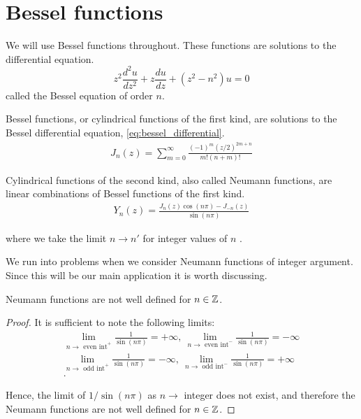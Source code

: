 \section{Bessel functions}
We will use Bessel functions throughout. These functions are solutions to the differential equation.
  \begin{equation}\label{eq:bessel_differential}
      z^2 \frac{d^2 u}{dz^2} + z\frac{du}{dz} + (z^2 - n^2)u = 0
  \end{equation}
called the Bessel equation of order $n$.\par
  \begin{defn}\label{defn:bessel_func}
  \parencite{korenev02bessel_func} Bessel functions, or cylindrical functions of the first kind, are solutions to the Bessel differential equation, \eqref{eq:bessel_differential}.
    \begin{align*}
        J_n(z) = \sum^\infty_{m=0} \frac{
        (-1)^m (z/2)^{2m+n} }{
        m! (n+m)! }
    \end{align*}
  \end{defn}
  \begin{defn}\label{defn:neumann_func}
  \parencite{korenev02bessel_func} Cylindrical functions of the second kind, also called Neumann functions, are linear combinations of Bessel functions of the first kind.
    \begin{align*}
        Y_n (z) = \frac{J_n(z) \cos (n \pi) - J_{-n}(z)}{\sin (n \pi)}
    \end{align*} \par
  where we take the limit $ n\rightarrow n'$ for integer values of $n$ \parencite{cohen02numth}.
  \end{defn}\par
%
We run into problems when we consider Neumann functions of integer argument. Since this will be our main application it is worth discussing.
  \begin{propn}
    Neumann functions are not well defined for $n \in \mathbb{Z}$.
  \end{propn}
  \begin{proof}
    It is sufficient to note the following limits:
      \begin{align*}
        \lim_{n\rightarrow \text{ even int}^{+}} \frac{1}{\sin(n\pi)} = + \infty,~
        \lim_{n\rightarrow \text{ even int}^{-}} \frac{1}{\sin(n\pi)} = - \infty \\
        \lim_{n\rightarrow \text{ odd int}^{+}} \frac{1}{\sin(n\pi)} = - \infty,~
        \lim_{n\rightarrow \text{ odd int}^{-}} \frac{1}{\sin(n\pi)} = + \infty \\.
      \end{align*}\par
    Hence, the limit of $1/\sin(n\pi)$ as $n\rightarrow$ integer does not exist, and therefore the Neumann functions are not well defined for $n \in \mathbb{Z}$.
  \end{proof}\par
